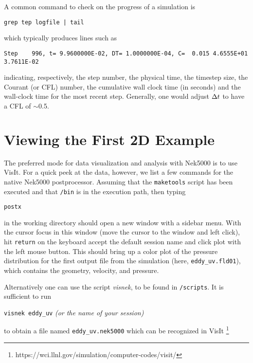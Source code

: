 A common command to check on the progress of a simulation is
\begin{verbatim}
grep tep logfile | tail
\end{verbatim}
which typically produces lines such as
\scriptsize
\begin{verbatim}
Step    996, t= 9.9600000E-02, DT= 1.0000000E-04, C=  0.015 4.6555E+01 3.7611E-02
\end{verbatim}
\normalsize
indicating, respectively, the step number, the physical time, the
timestep size, the Courant (or CFL) number, the cumulative wall clock time (in seconds)
and the wall-clock time for the most recent step.   Generally, one would 
adjust $\Delta t$ to have a CFL of $\sim$0.5.  



\section{Viewing the First 2D Example}

The preferred mode for data visualization and analysis with Nek5000 is
to use VisIt.  For a quick
peek at the data, however, we list a few commands for the native Nek5000 
postprocessor.   Assuming that the {\tt maketools} script has been executed
and that {\tt /bin} is in the execution path, then typing 

\noindent
{\tt postx} 

\noindent
in the working directory should open a new window with a sidebar menu.
With the cursor focus in this window (move the cursor to the window and
left click), hit {\tt return} on the keyboard accept the default session name and click {\sc plot} with the left mouse button.  This should bring up
a color plot of the pressure distribution for the first output file
from the simulation (here, {\tt eddy\_uv.fld01}), which contains the
geometry, velocity, and pressure.

Alternatively one can use the script \textit{visnek}, to be found in {\tt /scripts}. It is sufficient to run

\noindent
{\tt visnek eddy\_uv}\textit{ (or the name of your session)}

to obtain a file named {\tt eddy\_uv.nek5000} which can be recognized in VisIt \footnote{https://wci.llnl.gov/simulation/computer-codes/visit/}


\begin{comment}
To see the vorticity at the final time, load the last output file,
{\tt eddy\_uv.fld12}, by clicking/typing the following in the postx window:
\begin{tabular}{r l l l}
  & {\bf click} \hspace*{1in} &{\bf type} \hspace*{1in} & {\bf comment} \\ \hline
1.& SET TIME         & 12 & load fld12 \\
2.& SET QUANTITY \\
3.& VORTICITY \\
4.& PLOT 
\end{tabular}
\end{comment}

